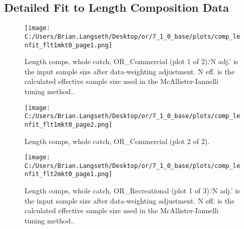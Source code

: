 \documentclass[11pt,
  english,
  a4paper,
]{article}
\begin{document}

\hypertarget{detailed-fit-to-length-composition-data}{%
\subsection{Detailed Fit to Length Composition Data}\label{detailed-fit-to-length-composition-data}}

\leavevmode\tagmcend\tagstructend


\begin{figure}
\centering
\texttt{[image: C:/Users/Brian.Langseth/Desktop/or/7\_1\_0\_base/plots/comp\_lenfit\_flt1mkt0\_page1.png]}
\caption{Length comps, whole catch, OR\_Commercial (plot 1 of 2).`N adj.' is the input sample size after data-weighting adjustment. N eff. is the calculated effective sample size used in the McAllister-Iannelli tuning method..\label{fig:comp_lenfit_flt1mkt0_page1}}
\end{figure}

\tagmcend\tagstructend


\begin{figure}
\centering
\texttt{[image: C:/Users/Brian.Langseth/Desktop/or/7\_1\_0\_base/plots/comp\_lenfit\_flt1mkt0\_page2.png]}
\caption{Length comps, whole catch, OR\_Commercial (plot 2 of 2).\label{fig:comp_lenfit_flt1mkt0_page2}}
\end{figure}

\tagmcend\tagstructend


\begin{figure}
\centering
\texttt{[image: C:/Users/Brian.Langseth/Desktop/or/7\_1\_0\_base/plots/comp\_lenfit\_flt2mkt0\_page1.png]}
\caption{Length comps, whole catch, OR\_Recreational (plot 1 of 3).`N adj.' is the input sample size after data-weighting adjustment. N eff. is the calculated effective sample size used in the McAllister-Iannelli tuning method..\label{fig:comp_lenfit_flt2mkt0_page1}}
\end{figure}
\end{document}
